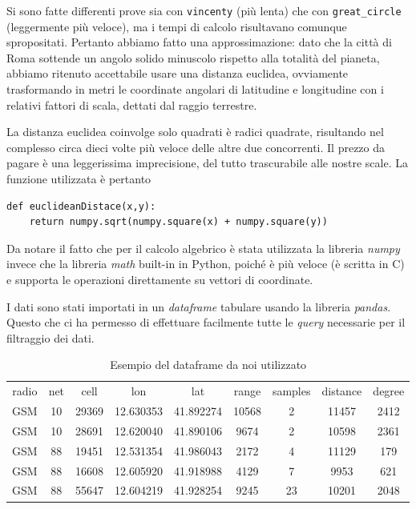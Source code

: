 Si sono fatte differenti prove sia con \lstinline{vincenty} (più lenta) che con \lstinline{great_circle} (leggermente più veloce), ma i tempi di calcolo risultavano comunque spropositati. Pertanto abbiamo fatto una approssimazione: dato che la città di Roma sottende un angolo solido minuscolo rispetto alla totalità del pianeta, abbiamo ritenuto accettabile usare una distanza euclidea, ovviamente trasformando in metri le coordinate angolari di latitudine e longitudine con i relativi fattori di scala, dettati dal raggio terrestre.

La distanza euclidea coinvolge solo quadrati è radici quadrate, risultando nel complesso circa dieci volte più veloce delle altre due concorrenti. Il prezzo da pagare è una leggerissima imprecisione, del tutto trascurabile alle nostre scale. La funzione utilizzata è pertanto
\begin{lstlisting}
def euclideanDistace(x,y):
    return numpy.sqrt(numpy.square(x) + numpy.square(y))
\end{lstlisting}
Da notare il fatto che per il calcolo algebrico è stata utilizzata la libreria \emph{numpy} invece che la libreria \emph{math} built-in in Python, poiché è più veloce (è scritta in C) e supporta le operazioni direttamente su vettori di coordinate.

I dati sono stati importati in un \emph{dataframe} tabulare usando la libreria \emph{pandas}. Questo che ci ha permesso di effettuare facilmente tutte le \emph{query} necessarie per il filtraggio dei dati.
\clearpage

\begin{table}[t]
\caption{Esempio del dataframe da noi utilizzato}
	\begin{tabular}{ccccccccc}
	\toprule
radio	&net &cell 	&lon 	 &lat 		&range 	&samples 	&distance &degree\\
GSM		&10 	&29369 	&12.630353 &41.892274 	&10568 	&2 		&11457 	&2412\\
GSM 		&10 	&28691 	&12.620040 &41.890106 	&9674 	&2 		&10598 	&2361\\
GSM 		&88 	&19451 	&12.531354 &41.986043 	&2172 	&4 		&11129 	&179\\
GSM 		&88 	&16608 	&12.605920 &41.918988 	&4129 	&7 		&9953 	&621\\
GSM 		&88 	&55647 	&12.604219 &41.928254 	&9245 	&23 		&10201 	&2048\\
\bottomrule
	\end{tabular}
\label{tab:datinostri}
\end{table}

